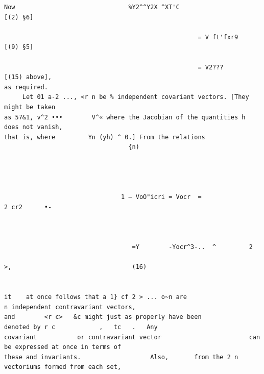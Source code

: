 \documentclass[10pt]{article}
\begin{document}
\begin{verbatim}
Now                               %Y2^^Y2X ^XT'C                                          [(2) §6]

                                                     = V ft'fxr9                      [(9) §5]

                                                     = V2???                          [(15) above],
as required.
     Let 01 a-2 ..., <r n be % independent covariant vectors. [They might be taken
as 57&1, v^2 •••        V^« where the Jacobian of the quantities h does not vanish,
that is, where         Yn (yh) ^ 0.] From the relations
                                  {n)




                                1 — VoO"icri = Vocr  =                            2 cr2      •-



                                   =Y        -Yocr^3-..  ^         2
                                                                                                  >,                                 (16)


it    at once follows that a 1} cf 2 > ... o~n are                      n independent contravariant vectors,
and        <r c>   &c might just as properly have been                                        denoted by r c            ,   tc   .   Any
covariant           or contravariant vector                        can be expressed at once in terms of
these and invariants.                   Also,       from the 2 n vectoriums formed from each set,


\end{verbatim}
\clearpage
\end{document}
